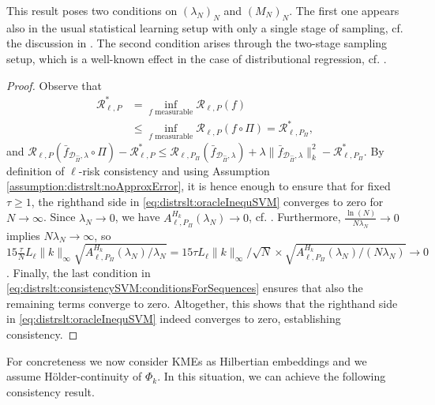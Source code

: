 \documentclass[letterpaper]{article} %
\newcommand{\fm}{\Phi} %
\newcommand{\dataSet}{\mathcal{D}}
\newcommand{\risk}{\mathcal{R}} %
\newcommand{\Risk}[2]{\risk_{{#1},{#2}}} %
\newcommand{\RiskBayes}[2]{\risk_{{#1},{#2}}^\ast} %
\newcommand{\hilbertianEmbed}{\Pi} %
\newcommand{\ApproxErrorFunc}[3]{A^{#3}_{#1,#2}}
\newcommand{\Aef}{\ApproxErrorFunc{\ell}{P_\hilbertianEmbed}{H_k}}
\newcommand{\clipped}[1]{\bar{#1}}
\begin{document}
This result poses two conditions on $(\lambda_N)_N$ and $(M_N)_N$.
The first one appears also in the usual statistical learning setup with only a single stage of sampling, cf. the discussion in \cite[Section~7.4]{SC08}.
The second condition arises through the two-stage sampling setup, which is a well-known effect in the case of distributional regression, cf. \cite{szabo2015two,szabo2016learning}.
\begin{proof}
Observe that 
\begin{align*}
   \RiskBayes{\ell}{P} & =\inf_{f\text{ measurable}} \Risk{\ell}{P}(f) \\
   & \leq \inf_{f\text{ measurable}} \Risk{\ell}{P}(f \circ \hilbertianEmbed) =\RiskBayes{\ell}{P_\hilbertianEmbed}, 
\end{align*}
and
$\Risk{\ell}{P}(\clipped{f}_{\dataSet_{\hat\hilbertianEmbed},\lambda} \circ \hilbertianEmbed) - \RiskBayes{\ell}{P}
    \leq 
    \Risk{\ell}{P_\hilbertianEmbed}(\clipped{f}_{\dataSet_{\hat\hilbertianEmbed},\lambda})
    + \lambda \|\clipped{f}_{\dataSet_{\hat\hilbertianEmbed},\lambda}\|_k^2 - \RiskBayes{\ell}{P_\hilbertianEmbed}$.
By definition of $\ell$-risk consistency and using Assumption \ref{assumption:distrslt:noApproxError}, it is hence enough to ensure that for fixed $\tau\geq 1$, the righthand side in \eqref{eq:distrslt:oracleInequSVM} converges to zero for $N\rightarrow \infty$.
Since $\lambda_N\rightarrow 0$, we have $\Aef(\lambda_N)\rightarrow 0$, cf. \cite[Lemma~5.15]{SC08}.
Furthermore, $\frac{\ln(N)}{N\lambda_N}\rightarrow 0$ implies $N\lambda_N\rightarrow \infty$, %
so $15\frac{\tau}{N}L_\ell \|k\|_\infty\sqrt{\Aef(\lambda_N)/\lambda_N} = 15\tau L_\ell \|k\|_\infty / \sqrt{N} \times \sqrt{\Aef(\lambda_N)/(N\lambda_N)}\rightarrow 0$.
Finally, the last condition in \eqref{eq:distrslt:consistencySVM:conditionsForSequences} ensures that also the remaining terms converge to zero.
Altogether, this shows that the righthand side in \eqref{eq:distrslt:oracleInequSVM} indeed converges to zero, establishing consistency.
\end{proof}
For concreteness we now consider KMEs as Hilbertian embeddings and we assume Hölder-continuity of $\fm_k$.
In this situation, we can achieve the following consistency result.
\end{document}
